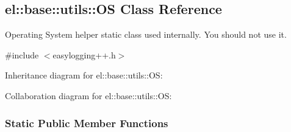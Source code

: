 \hypertarget{a00063}{}\subsection{el\+:\+:base\+:\+:utils\+:\+:O\+S Class Reference}
\label{a00063}


Operating System helper static class used internally. You should not use it.  




{\ttfamily \#include $<$easylogging++.\+h$>$}



Inheritance diagram for el\+:\+:base\+:\+:utils\+:\+:O\+S\+:


Collaboration diagram for el\+:\+:base\+:\+:utils\+:\+:O\+S\+:
\subsubsection*{Static Public Member Functions}
